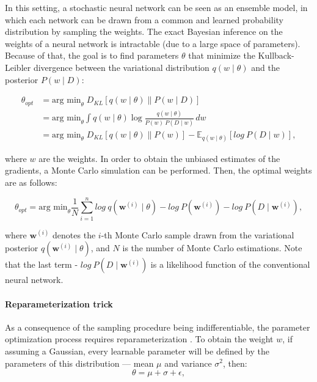 \vspace{\baselineskip}
In this setting, a stochastic neural network can be seen as an ensemble model, in which each network can be drawn from a common and learned probability distribution by sampling the weights. The exact Bayesian inference on the weights of a neural network is intractable (due to a large space of parameters). Because of that, the goal is to find parameters $\theta$ that minimize the Kullback-Leibler divergence between the variational distribution $q(w \mid \theta)$ and the posterior $P(w \mid D)$:

\begin{equation}\label{eq:bnn-kl-divergence-transformation}
\begin{split}
    \theta_{opt} &= \text{arg min}_\theta\; D_{KL}\left[q(w \mid \theta) \parallel P(w \mid D) \right] \\
    &= \text{arg min}_\theta \int q(w \mid \theta) \log\frac{q(w \mid \theta)}{P(w)\:P(D \mid w)}\, dw\\
    &= \text{arg min}_\theta\; D_{KL}\left[q(w \mid \theta) \parallel P(w) \right] - {\mathbb{E}}_{q(w \mid \theta)}\left[log\:P(D \mid w)\right],
\end{split}
\end{equation}

\noindent where $w$ are the weights. In order to obtain the unbiased estimates of the gradients, a Monte Carlo simulation can be performed. Then, the optimal weights are as follows:

\begin{equation}\label{eq:bayes-by-backprop-loss}
     \theta_{opt} = \text{arg min}_\theta \frac{1}{N} \sum^{n}_{i=1}log\:q(\mathbf{w}^{(i)} \mid \theta) - log\:P(\mathbf{w}^{(i)}) - log\:P(D \mid \mathbf{w}^{(i)}),
\end{equation}

\noindent where $\mathbf{w}^{(i)}$ denotes the $i$-th Monte Carlo sample drawn from the variational posterior $q(\mathbf{w}^{(i)} \mid \theta)$, and $N$ is the number of Monte Carlo estimations. Note that the last term - $log\:P(D \mid \mathbf{w}^{(i)})$ is a likelihood function of the conventional neural network.

\paragraph{Reparameterization trick}
As a consequence of the sampling procedure being indifferentiable, the parameter optimization process requires reparameterization \cite{Kingma2015}. To obtain the weight $w$, if assuming a Gaussian, every learnable parameter will be defined by the parameters of this distribution — mean $\mu$ and variance $\sigma^2$, then:
\begin{equation}
    \theta = \mu + \sigma + \epsilon,
\end{equation}

